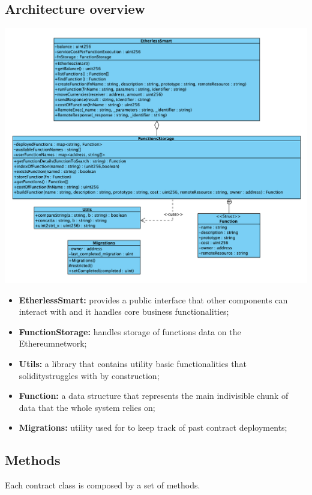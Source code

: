 \subsection{Architecture overview}
\includegraphics[width=\textwidth]{res/img/smart}
\begin{itemize}
	\item \textbf{EtherlessSmart:} provides a public interface that other components can interact with and it handles core business functionalities;
	\item \textbf{FunctionStorage:} handles storage of functions data on the Ethereum\glo network;
	\item \textbf{Utils:} a library that contains utility basic functionalities that solidity\glo struggles with by construction;
	\item \textbf{Function:} a data structure that represents the main indivisible chunk of data that the whole system relies on;
	\item \textbf{Migrations:} utility used for to keep track of past contract deployments;
\end{itemize}
\subsection{Methods}
Each contract class is composed by a set of methods.

